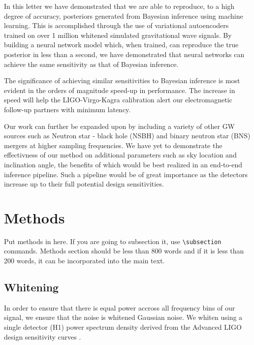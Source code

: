 \documentclass[%
showpacs,
 amsmath,amssymb,
 aps,
 twocolumn,
 prl,
 reprint,
floatfix,
]{revtex4-1}
\begin{document}
%
%
In this letter we have demonstrated that we 
are able to reproduce, to a high degree of accuracy, posteriors 
generated from Bayesian inference using machine learning. This 
is accomplished through the use of variational autoencoders 
trained on over 1 million whitened simulated gravitational 
wave signals. By building a neural network model which, 
when trained, can reproduce the true posterior in less than a 
second, we have demonstrated that neural networks 
can achieve the same sensitivity as that of Bayesian 
inference.

The significance of achieving similar sensitivities 
to Bayesian inference is most evident in the 
orders of magnitude speed-up in performance. The increase
in speed will help the LIGO-Virgo-Kagra calibration 
alert our electromagnetic follow-up partners with 
minimum latency.

Our work can further be expanded upon by including 
a variety of other GW sources such as Neutron star - 
black hole (NSBH) and binary neutron star (BNS) mergers 
at higher sampling frequencies. We have yet to demonstrate 
the effectivness of our method on additional parameters 
such as sky location and inclination angle, the benefits of which 
would be best realized in an end-to-end inference pipeline. 
Such a pipeline would be of great importance as the detectors 
increase up to their full potential design sensitivities.

\section{Methods}
Put methods in here.  If you are going to subsection it, use
\verb|\subsection| commands.  Methods section should be less than
800 words and if it is less than 200 words, it can be incorporated
into the main text.

\subsection{Whitening} \label{whiten_sec}

In order to ensure 
that there is equal power accross all
frequency bins of our signal, we ensure that the noise is whitened Gaussian
noise. We whiten using a single detector (H1) power spectrum density derived from the
Advanced LIGO design sensitivity curves \cite{2016LRR....19....1A}. 
\end{document}
